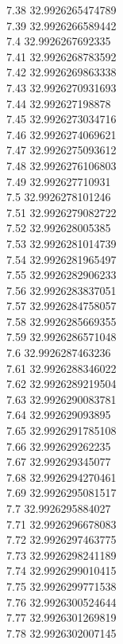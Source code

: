 {7.38	32.9926265474789\\
7.39	32.9926266589442\\
7.4	32.9926267692335\\
7.41	32.9926268783592\\
7.42	32.9926269863338\\
7.43	32.9926270931693\\
7.44	32.992627198878\\
7.45	32.9926273034716\\
7.46	32.9926274069621\\
7.47	32.9926275093612\\
7.48	32.9926276106803\\
7.49	32.992627710931\\
7.5	32.9926278101246\\
7.51	32.9926279082722\\
7.52	32.992628005385\\
7.53	32.9926281014739\\
7.54	32.9926281965497\\
7.55	32.9926282906233\\
7.56	32.9926283837051\\
7.57	32.9926284758057\\
7.58	32.9926285669355\\
7.59	32.9926286571048\\
7.6	32.9926287463236\\
7.61	32.9926288346022\\
7.62	32.9926289219504\\
7.63	32.9926290083781\\
7.64	32.992629093895\\
7.65	32.9926291785108\\
7.66	32.992629262235\\
7.67	32.992629345077\\
7.68	32.9926294270461\\
7.69	32.9926295081517\\
7.7	32.9926295884027\\
7.71	32.9926296678083\\
7.72	32.9926297463775\\
7.73	32.9926298241189\\
7.74	32.9926299010415\\
7.75	32.9926299771538\\
7.76	32.9926300524644\\
7.77	32.9926301269819\\
7.78	32.9926302007145\\
}
